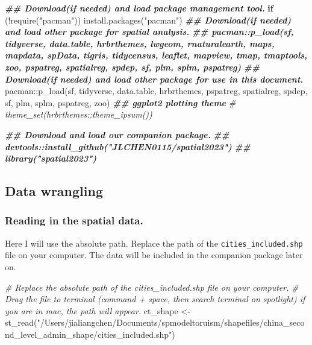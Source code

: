\documentclass[
]{article}
\newenvironment{Shaded}{\begin{snugshade}}{\end{snugshade}}
\newcommand{\CommentTok}[1]{\textcolor[rgb]{0.56,0.35,0.01}{\textit{#1}}}
\newcommand{\ControlFlowTok}[1]{\textcolor[rgb]{0.13,0.29,0.53}{\textbf{#1}}}
\newcommand{\DocumentationTok}[1]{\textcolor[rgb]{0.56,0.35,0.01}{\textbf{\textit{#1}}}}
\newcommand{\FunctionTok}[1]{\textcolor[rgb]{0.00,0.00,0.00}{#1}}
\newcommand{\NormalTok}[1]{#1}
\newcommand{\OtherTok}[1]{\textcolor[rgb]{0.56,0.35,0.01}{#1}}
\newcommand{\SpecialCharTok}[1]{\textcolor[rgb]{0.00,0.00,0.00}{#1}}
\newcommand{\StringTok}[1]{\textcolor[rgb]{0.31,0.60,0.02}{#1}}
\begin{document}
\begin{Shaded}
\begin{Highlighting}[]
\DocumentationTok{\#\# Download(if needed) and load package management tool.}
\ControlFlowTok{if}\NormalTok{ (}\SpecialCharTok{!}\FunctionTok{require}\NormalTok{(}\StringTok{"pacman"}\NormalTok{)) }\FunctionTok{install.packages}\NormalTok{(}\StringTok{"pacman"}\NormalTok{)}
\DocumentationTok{\#\# Download(if needed) and load other package for spatial analysis.}
\DocumentationTok{\#\# pacman::p\_load(sf, tidyverse, data.table, hrbrthemes, lwgeom, rnaturalearth, maps, mapdata, spData, tigris, tidycensus, leaflet, mapview, tmap, tmaptools, zoo, pspatreg, spatialreg, spdep, sf, plm, splm, pspatreg)}
\DocumentationTok{\#\# Download(if needed) and load other package for use in this document.}
\NormalTok{pacman}\SpecialCharTok{::}\FunctionTok{p\_load}\NormalTok{(sf, tidyverse, data.table, hrbrthemes, pspatreg, spatialreg, spdep, sf, plm, splm, pspatreg, zoo)}
\DocumentationTok{\#\# ggplot2 plotting theme}
\CommentTok{\# theme\_set(hrbrthemes::theme\_ipsum())}
\end{Highlighting}
\end{Shaded}

\begin{Shaded}
\begin{Highlighting}[]
\DocumentationTok{\#\# Download and load our companion package.}
\DocumentationTok{\#\# devtools::install\_github("JLCHEN0115/spatial2023")}
\DocumentationTok{\#\# library("spatial2023")}
\end{Highlighting}
\end{Shaded}

\hypertarget{data-wrangling}{%
\subsection{Data wrangling}\label{data-wrangling}}

\hypertarget{reading-in-the-spatial-data.}{%
\subsubsection{Reading in the spatial
data.}\label{reading-in-the-spatial-data.}}

Here I will use the absolute path. Replace the path of the
\texttt{cities\_included.shp} file on your computer. The data will be
included in the companion package later on.

\begin{Shaded}
\begin{Highlighting}[]
\CommentTok{\# Replace the absolute path of the \textasciigrave{}cities\_included.shp\textasciigrave{} file on your computer. }
\CommentTok{\# Drag the file to terminal (command + space, then search \textasciigrave{}terminal\textasciigrave{} on spotlight) if you are in mac, the path will appear.}
\NormalTok{ct\_shape }\OtherTok{\textless{}{-}} \FunctionTok{st\_read}\NormalTok{(}\StringTok{"/Users/jialiangchen/Documents/spmodeltoruism/shapefiles/china\_second\_level\_admin\_shape/cities\_included.shp"}\NormalTok{)}
\end{Highlighting}
\end{Shaded}
\end{document}
